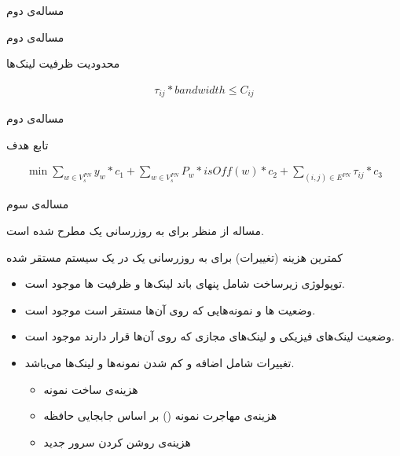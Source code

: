 \documentclass{beamer}
\makeatletter
\newcommand{\RTList}{\raggedleft\rightskip\@totalleftmargin}
\makeatother
\begin{document}
\begin{persian}
\begin{frame}{مساله‌ی دوم}
\end{frame}
\begin{frame}{مساله‌ی دوم}
	\par
	محدودیت ظرفیت لینک‌ها	
	\begin{latin}\begin{align}
		\tau_{ij} * bandwidth \le C_{ij}
	\end{align}\end{latin}
\end{frame}
\begin{frame}{مساله‌ی دوم}
	\par
	تابع هدف
	\begin{latin}\begin{align}
		\min \sum_{w \in V_{s}^{PN}} y_w * c_1 + \sum_{w \in V_{s}^{PN}} P_w * isOff(w) * c_2 + \sum_{(i,j) \in E^{PN}} \tau_{ij} * c_3
	\end{align}\end{latin}
\end{frame}
\begin{frame}{مساله‌ی سوم}
	\par
	مساله از منظر  برای به روزرسانی یک 
	مطرح شده است.
\end{frame}
\begin{frame}
	\par
	کمترین هزینه (تغییرات) برای به روزرسانی یک 
	در یک سیستم مستقر شده
\end{frame}
\begin{frame}
	\begin{itemize}\RTList{}
		\item توپولوژی زیرساخت شامل پنهای باند لینک‌ها و ظرفیت ها موجود است.
		\item وضعیت ها و نمونه‌هایی که روی آن‌ها مستقر است موجود است.
		\item وضعیت لینک‌های فیزیکی و لینک‌های مجازی که روی آن‌ها قرار دارند موجود است.
		\item تغییرات شامل اضافه و کم شدن نمونه‌ها و لینک‌ها می‌باشد.
		\begin{itemize}\RTList{}
			\item هزینه‌ی ساخت نمونه
			\item هزینه‌ی مهاجرت نمونه () بر اساس جابجایی حافظه
			\item هزینه‌ی روشن کردن سرور جدید
		\end{itemize}
	\end{itemize}
\end{frame}
\end{persian}
\end{document}

